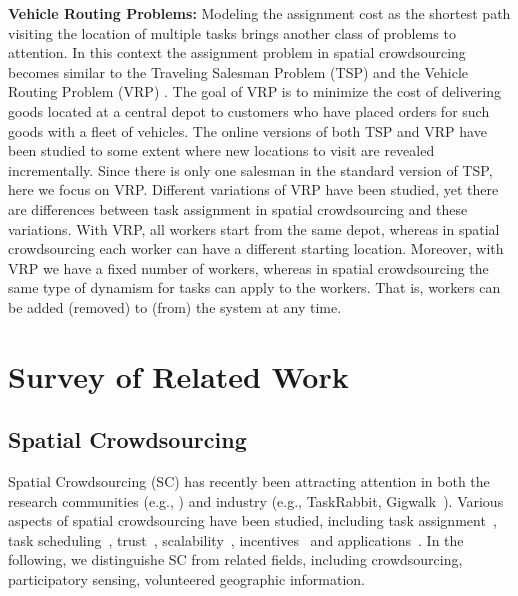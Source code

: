 \documentclass{USC-Thesis}
\numberwithin{equation}{chapter}
\begin{document}
\textbf{Vehicle Routing Problems:} Modeling the assignment cost as the shortest path visiting the location of multiple tasks brings another class of problems to attention. In this context the assignment problem in spatial crowdsourcing becomes similar to the Traveling Salesman Problem (TSP) \cite{lawler1985traveling} and the Vehicle Routing Problem (VRP) \cite{toth2001vehicle}. The goal of VRP is to minimize the cost of delivering goods located at a central depot to customers who have placed orders for such goods with a fleet of vehicles.  The online versions of both TSP and VRP have been studied to some extent where new locations to visit are revealed incrementally. Since there is only one salesman in the standard version of TSP, here we focus on VRP. Different variations of VRP have been studied, yet there are differences between task assignment in spatial crowdsourcing and these variations. 
With VRP, all workers start from the same depot, whereas in spatial crowdsourcing each worker can have a different starting location. Moreover, with VRP we have a fixed number of workers, whereas in spatial crowdsourcing the same type of dynamism for tasks can apply to the workers. That is, workers can be added (removed) to (from) the system at any time.


\chapter{Survey of Related Work}
\section{Spatial Crowdsourcing}
Spatial Crowdsourcing (SC) has recently been attracting attention in both the research communities (e.g., \cite{kazemi2012geocrowd,deng2013maximizing,to2014framework,to2016real,to2016sc}) and industry (e.g., TaskRabbit, Gigwalk~\cite{musthag2013labor}).
Various aspects of spatial crowdsourcing have been studied, including task assignment~\cite{kazemi2012geocrowd,dang2013maximum,pournajaf2014dynamic,Hassan2014a,to2015server,yu2015quality,ul2016efficient,to2016real}, task scheduling~\cite{deng2013maximizing,deng2015task}, trust~\cite{kazemi2013geotrucrowd,cheng2015reliable}, scalability~\cite{alfarrarjeh2015scalable}, incentives~\cite{musthag2013labor,teodoro2014motivations,thebault2015avoiding,to2016empirical} and applications~\cite{chen2014gmission,kim2014mediaq,to2015effectively,to2016scawg}.
In the following, we distinguishe SC from related fields, including crowdsourcing, participatory sensing, volunteered geographic information.
\end{document}
